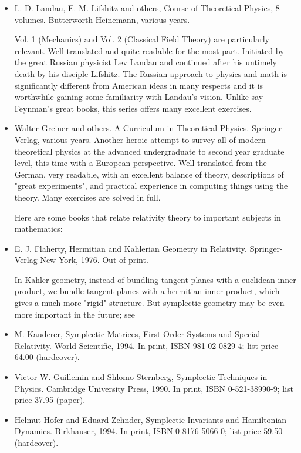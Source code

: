 \documentclass[10pt,a4paper]{book}
\theoremstyle{definition}
\begin{document}
\begin{itemize}
\item L. D. Landau, E. M. Lifshitz and others,
Course of Theoretical Physics, 8 volumes.
Butterworth-Heinemann, various years.

Vol. 1 (Mechanics) and Vol. 2 (Classical Field Theory) are particularly relevant.  Well translated and quite readable for the most part.  Initiated by the great Russian physicist Lev Landau and continued after his untimely death by his disciple Lifshitz.  The Russian approach to physics and math is significantly different from American ideas in many respects and it is worthwhile gaining some familiarity with Landau's vision.  Unlike say Feynman's great books, this series offers many excellent exercises.

\item Walter Greiner and others.
A Curriculum in Theoretical Physics.
Springer-Verlag, various years.
Another heroic attempt to survey all of modern theoretical physics at the advanced undergraduate to second year graduate level, this time with a European perspective.  Well translated from the German, very readable, with an excellent balance of theory, descriptions of "great experiments", and practical experience in computing things using the theory.  Many exercises are solved in full.

Here are some books that relate relativity theory to important subjects in mathematics:

\item E. J. Flaherty,
Hermitian and Kahlerian Geometry in Relativity.
Springer-Verlag New York, 1976.
Out of print.

In Kahler geometry, instead of bundling tangent planes with a euclidean inner product, we bundle tangent planes with a hermitian inner product, which gives a much more "rigid" structure.  But symplectic geometry may be even more important in the future; see

\item M. Kauderer,
Symplectic Matrices, First Order Systems and Special Relativity.
World Scientific, 1994.
In print, ISBN 981-02-0829-4; list price 64.00 (hardcover).

\item Victor W. Guillemin and Shlomo Sternberg,
Symplectic Techniques in Physics.
Cambridge University Press, 1990.
In print, ISBN 0-521-38990-9; list price 37.95 (paper).

\item Helmut Hofer and Eduard Zehnder,
Symplectic Invariants and Hamiltonian Dynamics.
Birkhauser, 1994.
In print, ISBN 0-8176-5066-0; list price 59.50 (hardcover).


\end{itemize}
\end{document}
